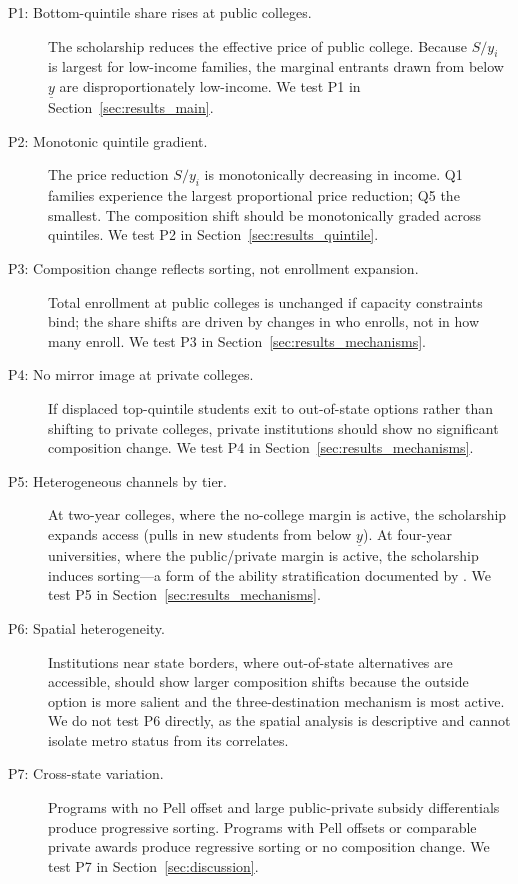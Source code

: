 \begin{description}
\item[P1: Bottom-quintile share rises at public colleges.] The
  scholarship reduces the effective price of public college. Because
  $S / y_i$ is largest for low-income families, the marginal entrants
  drawn from below $\underline{y}$ are disproportionately low-income.
  We test P1 in Section~\ref{sec:results_main}.

\item[P2: Monotonic quintile gradient.] The price reduction $S / y_i$
  is monotonically decreasing in income. Q1 families experience the
  largest proportional price reduction; Q5 the smallest. The
  composition shift should be monotonically graded across quintiles.
  We test P2 in Section~\ref{sec:results_quintile}.

\item[P3: Composition change reflects sorting, not enrollment
  expansion.] Total enrollment at public colleges is unchanged if
  capacity constraints bind; the share shifts are driven by changes in
  who enrolls, not in how many enroll.
  We test P3 in Section~\ref{sec:results_mechanisms}.

\item[P4: No mirror image at private colleges.] If displaced
  top-quintile students exit to out-of-state options rather than
  shifting to private colleges, private institutions should show no
  significant composition change.
  We test P4 in Section~\ref{sec:results_mechanisms}.

\item[P5: Heterogeneous channels by tier.] At two-year colleges, where
  the no-college margin is active, the scholarship expands access
  (pulls in new students from below $\underline{y}$). At four-year
  universities, where the public/private margin is active, the
  scholarship induces sorting---a form of the ability stratification
  documented by \textcite{cornwell2006sorting}.
  We test P5 in Section~\ref{sec:results_mechanisms}.

\item[P6: Spatial heterogeneity.] Institutions near state borders,
  where out-of-state alternatives are accessible, should show larger
  composition shifts because the outside option is more salient and the
  three-destination mechanism is most active.
  We do not test P6 directly, as the spatial analysis is descriptive
  and cannot isolate metro status from its correlates.

\item[P7: Cross-state variation.] Programs with no Pell offset and
  large public-private subsidy differentials produce progressive
  sorting. Programs with Pell offsets or comparable private awards
  produce regressive sorting or no composition change.
  We test P7 in Section~\ref{sec:discussion}.
\end{description}

